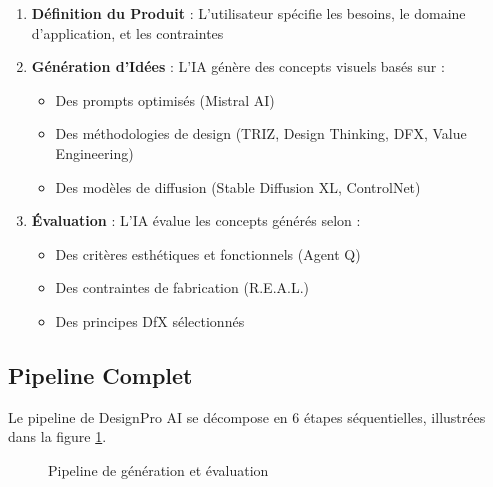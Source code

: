 \begin{enumerate}[leftmargin=*]
    \item \textbf{Définition du Produit} : L'utilisateur spécifie les besoins, le domaine d'application, et les contraintes
    
    \item \textbf{Génération d'Idées} : L'IA génère des concepts visuels basés sur :
    \begin{itemize}
        \item Des prompts optimisés (Mistral AI)
        \item Des méthodologies de design (TRIZ, Design Thinking, DFX, Value Engineering)
        \item Des modèles de diffusion (Stable Diffusion XL, ControlNet)
    \end{itemize}
    
    \item \textbf{Évaluation} : L'IA évalue les concepts générés selon :
    \begin{itemize}
        \item Des critères esthétiques et fonctionnels (Agent Q)
        \item Des contraintes de fabrication (R.E.A.L.)
        \item Des principes DfX sélectionnés
    \end{itemize}
\end{enumerate}

\subsection{Pipeline Complet}

Le pipeline de DesignPro AI se décompose en 6 étapes séquentielles, illustrées dans la figure \ref{fig:pipeline}.

\begin{figure}[H]
\centering
{}
\caption{Pipeline de génération et évaluation}
\label{fig:pipeline}
\end{figure}

